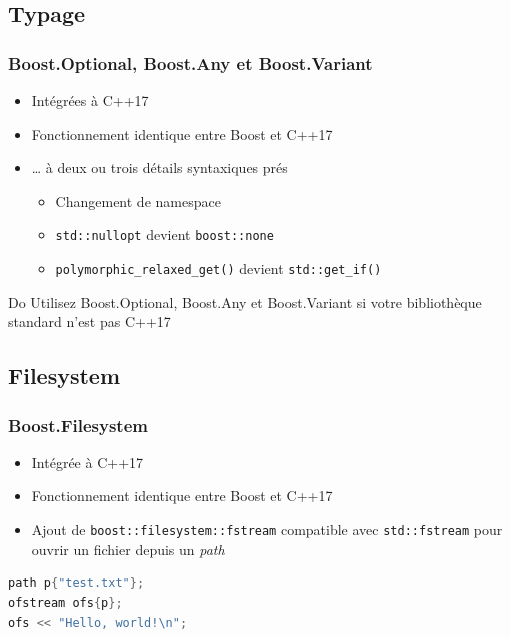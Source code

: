 \documentclass[C++.tex]{subfiles}
\begin{document}
\subsection*{Typage}
\begin{frame}[fragile]
	\frametitle{Boost.Optional, Boost.Any et Boost.Variant}
	\begin{itemize}
		\item Intégrées à C++17
		\item Fonctionnement identique entre Boost et C++17
		\item \ldots{} à deux ou trois détails syntaxiques prés
		\begin{itemize}
			\item Changement de namespace
			\item \lstinline|std::nullopt| devient \lstinline|boost::none|
			\item \lstinline|polymorphic_relaxed_get()| devient \lstinline|std::get_if()|
		\end{itemize}
	\end{itemize}

	\begin{exampleblock}{Do}
		Utilisez Boost.Optional, Boost.Any et Boost.Variant si votre bibliothèque standard n'est pas C++17
	\end{exampleblock}
\end{frame}

\subsection*{Filesystem}
\begin{frame}[fragile]
	\frametitle{Boost.Filesystem}
	\begin{itemize}
		\item Intégrée à C++17
		\item Fonctionnement identique entre Boost et C++17
		\item Ajout de \lstinline|boost::filesystem::fstream| compatible avec \lstinline|std::fstream| pour ouvrir un fichier depuis un \textit{path}

	\end{itemize}

	\begin{lstlisting}[language=C++]
path p{"test.txt"};
ofstream ofs{p};
ofs << "Hello, world!\n";\end{lstlisting}
\end{frame}
\end{document}
